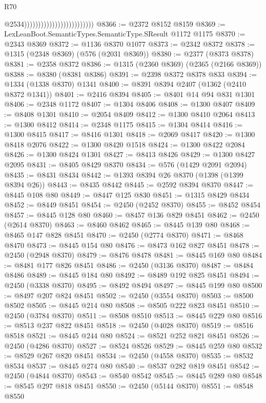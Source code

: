 \begin{lexlean}{R70}
\begin{coremodule}
                                                      @2534)))))))))))))))))))))))))
@8366 := @2372 @8152 @8159
@8369 := LexLeanBoot.SemanticTypes.SemanticType.SResult @1172 @1175
@8370 := @2343 @8369
@8372 := @1136 @8370 @1077
@8373 := @2342 @8372
@8378 := @1315 (@2348 @8369) (@576 (@2031 @8369))
@8380 := @2377 (@8373 @8378)
@8381 := @2358 @8372
@8386 := @1315 (@2360 @8369) (@2365 (@2166 @8369))
@8388 := @8380 (@8381 @8386)
@8391 := @2398 @8372 @8378 @833
@8394 := @1334 (@1338 @8370) @1341
@8400 := @8391 @8394 @2407 (@1362 (@2410 @8372 @1341))
@8401 := @2416 @8394
@8405 := @8401 @14 @94 @831 @1301
@8406 := @2348 @1172
@8407 := @1304 @8406
@8408 := @1300 @8407
@8409 := @8408 @1301
@8410 := @2054 @8409
@8412 := @1300 @8410 @2064
@8413 := @1300 @8412
@8414 := @2348 @1175
@8415 := @1304 @8414
@8416 := @1300 @8415
@8417 := @8416 @1301
@8418 := @2069 @8417
@8420 := @1300 @8418 @2076
@8422 := @1300 @8420 @1518
@8424 := @1300 @8422 @2084
@8426 := @1300 @8424 @1301
@8427 := @8413 @8426
@8429 := @1300 @8427 @2095
@8431 := @8405 @8429 @8370
@8434 := @576 (@1429 @2091 @2094)
@8435 := @8431 @8434
@8442 := @1393 @8394 @26 @8370 (@1398 (@1399 @8394 @26))
@8443 := @8435 @8442
@8445 := @2592 @8394 @8370
@8447 := @8445 @108 @80
@8449 := @8447 @125 @830
@8451 := @1315 @8429 @8434
@8452 := @8449 @8451
@8454 := @2450 (@2452 @8370)
@8455 := @8452 @8454
@8457 := @8445 @128 @80
@8460 := @8457 @136 @829 @8451
@8462 := @2450 (@2614 @8370)
@8463 := @8460 @8462
@8465 := @8445 @139 @80
@8468 := @8465 @147 @828 @8451
@8470 := @2450 (@2774 @8370)
@8471 := @8468 @8470
@8473 := @8445 @154 @80
@8476 := @8473 @162 @827 @8451
@8478 := @2450 (@2948 @8370)
@8479 := @8476 @8478
@8481 := @8445 @169 @80
@8484 := @8481 @177 @826 @8451
@8486 := @2450 (@3136 @8370)
@8487 := @8484 @8486
@8489 := @8445 @184 @80
@8492 := @8489 @192 @825 @8451
@8494 := @2450 (@3338 @8370)
@8495 := @8492 @8494
@8497 := @8445 @199 @80
@8500 := @8497 @207 @824 @8451
@8502 := @2450 (@3554 @8370)
@8503 := @8500 @8502
@8505 := @8445 @214 @80
@8508 := @8505 @222 @823 @8451
@8510 := @2450 (@3784 @8370)
@8511 := @8508 @8510
@8513 := @8445 @229 @80
@8516 := @8513 @237 @822 @8451
@8518 := @2450 (@4028 @8370)
@8519 := @8516 @8518
@8521 := @8445 @244 @80
@8524 := @8521 @252 @821 @8451
@8526 := @2450 (@4286 @8370)
@8527 := @8524 @8526
@8529 := @8445 @259 @80
@8532 := @8529 @267 @820 @8451
@8534 := @2450 (@4558 @8370)
@8535 := @8532 @8534
@8537 := @8445 @274 @80
@8540 := @8537 @282 @819 @8451
@8542 := @2450 (@4844 @8370)
@8543 := @8540 @8542
@8545 := @8445 @289 @80
@8548 := @8545 @297 @818 @8451
@8550 := @2450 (@5144 @8370)
@8551 := @8548 @8550

\end{coremodule}
\end{lexlean}
